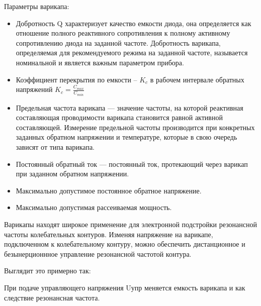 Параметры варикапа:
\begin{itemize}
\item Добротность Q характеризует качество емкости диода, она определяется как отношение полного реактивного сопротивления к полному активному сопротивлению диода на заданной частоте. Добротность варикапа, определяемая для рекомендуемого режима на заданной частоте, называется номинальной и является важным параметром прибора.
\item Коэффициент перекрытия по емкости – $K_c$ в рабочем интервале обратных напряжений $K_c = \frac{C_{max}}{C_{min}}$
\item Предельная частота варикапа — значение частоты, на которой реактивная составляющая проводимости варикапа становится равной активной составляющей. Измерение предельной частоты производится при конкретных заданных обратном напряжении и температуре, которые в свою очередь зависят от типа варикапа.
\item Постоянный обратный ток — постоянный ток, протекающий через варикап при заданном обратном напряжении.
\item Максимально допустимое постоянное обратное напряжение.
\item Максимально допустимая рассеиваемая мощность.
\end{itemize}

Варикапы находят широкое применение для электронной подстройки резонансной частоты колебательных контуров. Изменяя напряжение на варикапе, подключенном к колебательному контуру, можно обеспечить дистанционное и безынерционнное управление резонансной частотой контура. 

Выглядит это примерно так:
\begin{center}
	\begin{figure}[h!]
		\caption{}	
	\end{figure}
\end{center}

При подаче управляющего напряжения Uупр меняется емкость варикапа и как следствие резонансная частота.
